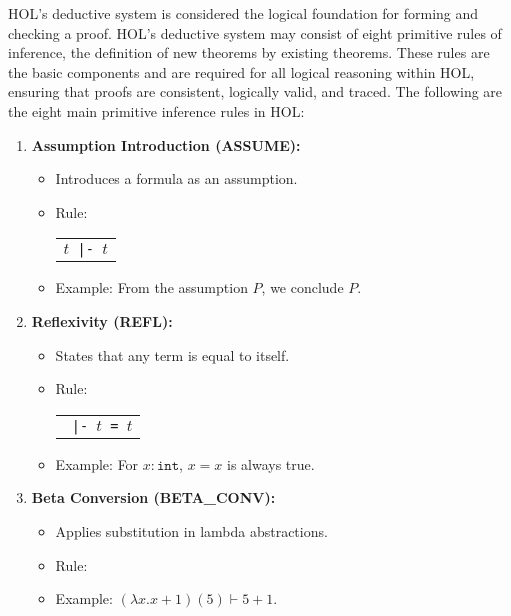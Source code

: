 HOL's deductive system is considered the logical foundation for forming and checking a proof. HOL's deductive system may consist of eight primitive rules of inference, the definition of new theorems by existing theorems. These rules are the basic components and are required for all logical reasoning within HOL, ensuring that proofs are consistent, logically valid, and traced. The following are the eight main primitive inference rules in HOL:

\begin{enumerate}
    \item \textbf{Assumption Introduction (ASSUME):}
    \begin{itemize}
        \item Introduces a formula as an assumption.
        \item Rule:
          \begin{center}
            \begin{tabular}{c}
              \\ \hline
              $t${\small\verb+ |- +}$t$ \\
            \end{tabular}
          \end{center}
        \item Example: From the assumption \(P\), we conclude \(P\).
    \end{itemize}

    \item \textbf{Reflexivity (REFL):}
    \begin{itemize}
        \item States that any term is equal to itself.
        \item Rule:
          \begin{center}
            \begin{tabular}{c}
              \\ \hline
                 {\small\verb+ |- +}$t${\small\verb+ = +}$t$ \\
            \end{tabular}
          \end{center}
        \item Example: For \(x : \texttt{int}\), \(x = x\) is always true.
    \end{itemize}

    \item \textbf{Beta Conversion (BETA\_CONV):}
    \begin{itemize}
        \item Applies substitution in lambda abstractions.
        \item Rule:
        \item Example: \((\lambda x. x + 1)(5) \vdash 5 + 1\).
    \end{itemize}


\end{enumerate}
